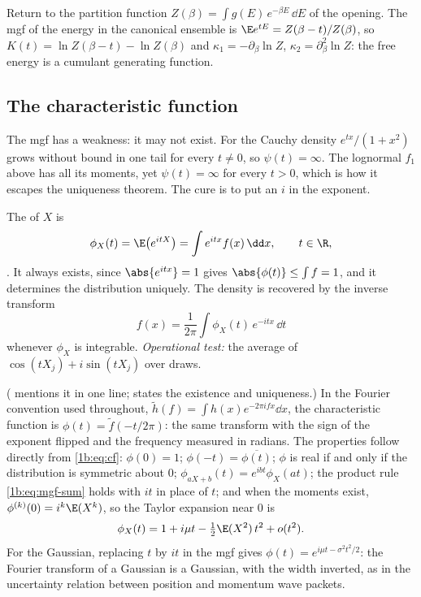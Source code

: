 Return to the partition function $Z(\beta)=\int g(E)\,e^{-\beta E}\,\dd E$ of
the opening. The mgf of the energy in the canonical ensemble is
$\E e^{tE}=Z(\beta-t)/Z(\beta)$, so $K(t)=\ln Z(\beta-t)-\ln Z(\beta)$ and
$\kappa_1=-\partial_\beta\ln Z$, $\kappa_2=\partial^2_\beta\ln Z$: the free
energy is a cumulant generating function.

\subsection{The characteristic function}

The mgf has a weakness: it may not exist. For the Cauchy density
$e^{tx}/(1+x^2)$ grows without bound in one tail for every $t\neq0$, so
$\psi(t)=\infty$. The lognormal $f_1$ above has all its moments, yet
$\psi(t)=\infty$ for every $t>0$, which is how it escapes the uniqueness
theorem. The cure is to put an $i$ in the exponent.

\begin{workdef}
The  of $X$ is
\begin{equation}
  \phi_X(t)=\E\bigl(e^{itX}\bigr)=\int e^{itx}f(x)\,\dd x ,\qquad t\in\R ,
  \label{1b:eq:cf}
\end{equation}
. It always exists, since
$\abs{e^{itx}}=1$ gives $\abs{\phi(t)}\le\int f=1$, and it determines the
distribution uniquely. The density is recovered by the inverse transform
\begin{equation}
  f(x)=\frac{1}{2\pi}\int\phi_X(t)\,e^{-itx}\,\dd t
  \label{1b:eq:cf-inverse}
\end{equation}
whenever $\phi_X$ is integrable.
\emph{Operational test:} the average of $\cos(tX_j)+i\sin(tX_j)$ over draws.
\end{workdef}

( mentions it in one line;
 states the existence and uniqueness.) In the
Fourier convention used throughout, $\tilde h(f)=\int h(x)e^{-2\pi ifx}\dd x$, the
characteristic function is $\phi(t)=\tilde f(-t/2\pi)$: the same transform with
the sign of the exponent flipped and the frequency measured in radians. The
properties follow directly from \eqref{1b:eq:cf}: $\phi(0)=1$;
$\phi(-t)=\overline{\phi(t)}$; $\phi$ is real if and only if the distribution
is symmetric about $0$; $\phi_{aX+b}(t)=e^{ibt}\phi_X(at)$; the product rule
\eqref{1b:eq:mgf-sum} holds with $it$ in place of $t$; and when the moments
exist, $\phi^{(k)}(0)=i^k\E(X^k)$, so the Taylor expansion near $0$ is
\begin{equation}
  \phi_X(t)=1+i\mu t-\tfrac12\E(X^2)\,t^2+o(t^2) .
  \label{1b:eq:cf-taylor}
\end{equation}
For the Gaussian, replacing $t$ by $it$ in the mgf gives
$\phi(t)=e^{i\mu t-\sigma^2t^2/2}$: the Fourier transform of a Gaussian is a
Gaussian, with the width inverted, as in the uncertainty relation between
position and momentum wave packets.

